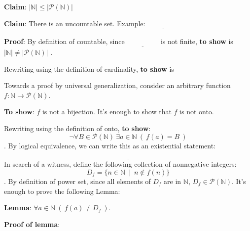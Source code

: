 \documentclass[12pt, oneside]{article}
\begin{document}
\vspace{20pt}

{\bf Claim}: $| \mathbb{N} | \leq |\mathcal{P} ( \mathbb{N} ) |$

\vspace{100pt}
\newpage
{\bf Claim}: There is an uncountable set.  Example: $\underline{\phantom{~~~\mathcal{P}(\mathbb{N})~~~}}$

{\bf Proof}:  By definition of countable, since $\underline{\phantom{~~~\mathcal{P}(\mathbb{N})~~~}}$
is not finite, {\bf to show} is $|\mathbb{N}| \neq  |\mathcal{P}(\mathbb{N})|$ .

Rewriting using  the definition of  cardinality, {\bf to show} is




Towards a proof by  universal generalization,  consider  an arbitrary function $f:  \mathbb{N} \to\mathcal{P}(\mathbb{N})$.

{\bf To show}: $f$ is not a bijection.  It's enough to show that $f$ is not onto.

Rewriting using the definition of  onto, {\bf to show}:
\[
\neg  \forall  B \in  \mathcal{P}(\mathbb{N}) ~\exists a \in \mathbb{N}  ~(~f(a) =  B~)
\]
. By logical  equivalence, we can write this as an existential statement:
\[
\underline{\phantom{\qquad\qquad\exists B \in  \mathcal{P}(\mathbb{N}) ~\forall a \in \mathbb{N}  ~(~f(a) \neq  B~)\qquad\qquad}}
\]
In search of a witness, define the following  collection of nonnegative integers:
\[
D_f = \{ n \in \mathbb{N}  ~\mid~  n \notin f(n)  \}
\]
. By  definition  of power  set, since  all elements  of  $D_f$ are  in  $\mathbb{N}$,   $D_f \in \mathcal{P}(\mathbb{N})$.  It's enough to prove the following Lemma: 

{\bf Lemma}: $\forall a \in \mathbb{N}  ~(~f(a) \neq  D_f~)$.


{\bf Proof  of lemma}: \\
\end{document}
